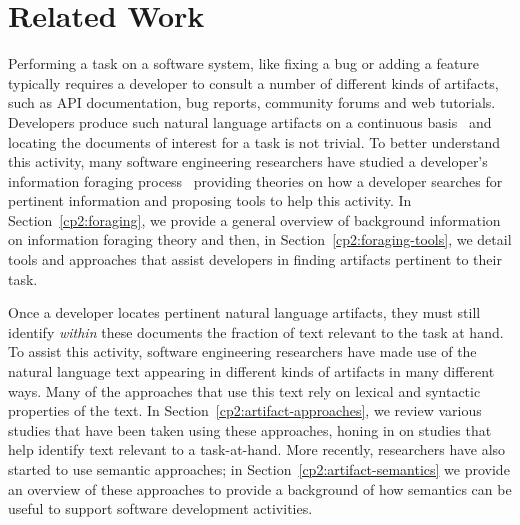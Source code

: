 \setcounter{chapter}{1}


\chapter{Related Work}
\label{ch:related-work}








Performing a task on a software system, like fixing a bug
or adding a feature typically requires a developer to consult
a number of different kinds of artifacts, such
as API documentation, bug reports, community forums
and web tutorials. 
Developers produce such natural language artifacts on a 
continuous basis~\cite{Rastkar2013t} 
and locating the documents of interest for a task
is not trivial. 
To better understand this activity, 
many software engineering researchers 
have studied  a developer's information foraging process~\cite{Pirolli1999}
providing theories on how a developer searches for pertinent information
and proposing tools to help this activity.
In Section~\ref{cp2:foraging},
we provide a general overview of background information on 
information foraging theory and 
then, in Section~\ref{cp2:foraging-tools}, we detail tools and approaches that assist developers in finding artifacts pertinent to their task.



Once a developer locates pertinent
natural language artifacts, 
they must still identify \textit{within} these documents 
the fraction of text relevant to the task at hand.
To assist this activity, software engineering researchers have made use of the natural language text appearing in different kinds of artifacts in many different ways.
Many of the approaches that
use this text rely on lexical and syntactic properties of the text. 
In Section~\ref{cp2:artifact-approaches}, we review various studies that have been taken using these approaches,
honing in on studies that help identify text relevant to a task-at-hand.
More recently, researchers have also started to use semantic approaches; 
in Section~\ref{cp2:artifact-semantics} we 
provide an overview of these approaches to provide a background of
how semantics can be useful to support software development activities.



\clearpage






